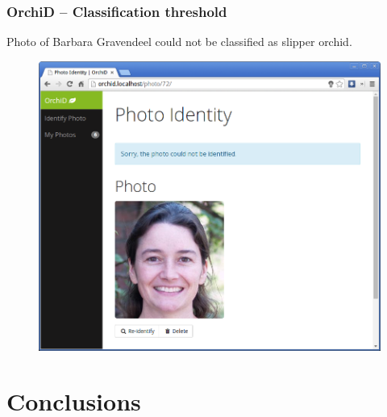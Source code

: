 \documentclass[]{beamer}
\begin{document}
    \begin{frame}[plain]
        \frametitle{OrchiD -- Classification threshold}

        Photo of Barbara Gravendeel could not be classified as slipper orchid.

        \begin{figure}[!htb]
              \includegraphics[width=\linewidth]{OrchiD_Barbara}
            \endminipage\hfill
        \end{figure}
    \end{frame}


\section{Conclusions}
\end{document}
